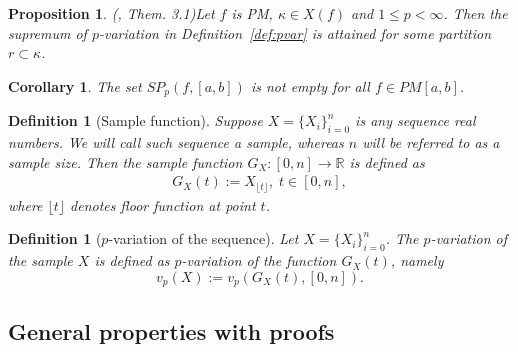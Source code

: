 \documentclass[12pt, a4paper]{article}
\newtheorem{proposition}[theorem]{Proposition}
\newtheorem{definition}[theorem]{Definition}
\newtheorem{corollary}[theorem]{Corollary}
\numberwithin{equation}{section}
\begin{document}
\begin{proposition}(\cite{Qian}, Them. 3.1)\label{prop:sup_in_PM}
  Let $f$ is PM, $\kappa \in X(f)$ and $1 \leq p < \infty$. 
  Then the supremum of $p$-variation in Definition~\ref{def:pvar}
  is attained for some partition $r \subset  \kappa$.
\end{proposition} 
\begin{corollary}\label{cor:SPNotEmpty}
  The set $SP_{p}(f,[a,b])$ is not empty for all $f \in PM[a,b]$.  
\end{corollary}


\begin{definition}[Sample function]\label{def:Seq2Fun}
  Suppose $X=\{X_{i}\}_{i=0}^{n}$ is any sequence real numbers. 
  We will call such sequence a \emph{sample}, 
  whereas $n$ will be referred to as a \emph{sample size}.
  Then the \emph{sample function}  
  $G_X:[0,n] \rightarrow \mathbb{R}$ is defined as 
  \begin{eqnarray}
    G_X(t) := X_{\lfloor t \rfloor},\;t\in[0,n],
  \end{eqnarray}
  where $\lfloor t \rfloor$ denotes floor function at point $t$. 
\end{definition} 

\begin{definition}[$p$-variation of the sequence]\label{def:pvarseq}
  Let $X=\{X_i\}_{i=0}^n$. The $p$-variation
  of the sample $X$ is defined as $p$-variation of the 
  function $G_X(t)$, namely
  \begin{equation}
    v_p(X) := v_p(G_X(t),[0,n]).
  \end{equation}
\end{definition}


\subsection{General properties with proofs}
\end{document}
